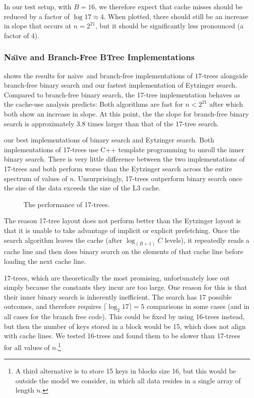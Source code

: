 \documentclass{patmorin}
\newcommand{\naive}{na\"{\i}ve}
\begin{document}
In our test setup, with $B=16$, we therefore expect that cache misses
should be reduced by a factor of $\log 17\approx 4$. When plotted,
there should still be an increase in slope that occurs at $n=2^{21}$,
but it should be significantly less pronounced (a factor of 4).

\subsubsection{Na\"{\i}ve and Branch-Free BTree Implementations}

 shows the results for \naive\ and branch-free
implementations of $17$-trees alongside branch-free binary search
and our fastest implementation of Eytzinger search.  Compared to
branch-free binary search, the 17-tree implementation behaves as the
cache-use analysis predicts:  Both algorithms are fast for $n<2^{21}$
after which both show an increase in slope. At this point, the the slope
for branch-free binary search is approximately 3.8 times larger than
that of the 17-tree search.


our best implementations of binary
search and Eytzinger search.  Both implementations of 17-trees use C++
template programming to unroll the inner binary search.  There is very
little difference between the two implementations of 17-trees and both
perform worse than the Eytzinger search across the entire spectrum of
values of $n$. Unsurprisingly, 17-trees outperform binary search once
the size of the data exceeds the size of the L3 cache.

\begin{figure}
   \caption{The performance of 17-trees.}
\end{figure}

The reason 17-tree layout does not perform better than the Eytzinger
layout is that it is unable to take advantage of implicit or explicit
prefetching.  Once the search algorithm leaves the cache (after $\log_{(B+1)} C$ levels), it repeatedly reads a cache line and then does binary search on the elements of that cache line before loading the next cache line.



17-trees, which are theoretically the most promising, unfortunately lose
out simply because the constants they incur are too large.  One reason
for this is that their inner binary search is inherently inefficient. The
search has 17 possible outcomes, and therefore requires $\lceil\log_2
17\rceil=5$ comparisons in some cases (and in all cases for the branch
free code).  This could be fixed by using 16-trees instead, but then the
number of keys stored in a block would be 15, which does not align with
cache lines.  We tested 16-trees and found them to be slower than 17-trees
for all values of $n$.\footnote{A third alternative is to store 15 keys
in blocks size 16, but this would be outside the model we consider,
in which all data resides in a single array of length $n$.}
\end{document}
